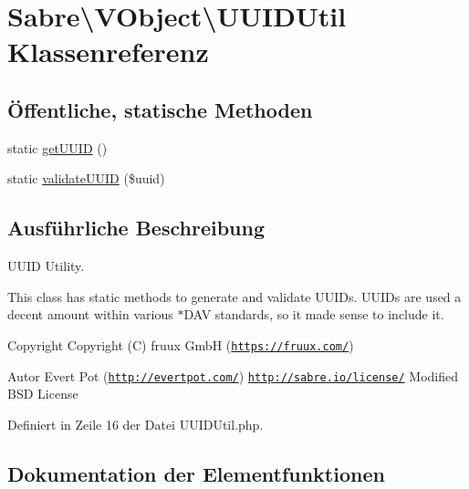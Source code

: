 \hypertarget{class_sabre_1_1_v_object_1_1_u_u_i_d_util}{}\section{Sabre\textbackslash{}V\+Object\textbackslash{}U\+U\+I\+D\+Util Klassenreferenz}
\label{class_sabre_1_1_v_object_1_1_u_u_i_d_util}
\subsection*{Öffentliche, statische Methoden}
\begin{DoxyCompactItemize}
\item 
static \mbox{\hyperlink{class_sabre_1_1_v_object_1_1_u_u_i_d_util_ac1ddb3af50bc514162f75bdfd03f8822}{get\+U\+U\+ID}} ()
\item 
static \mbox{\hyperlink{class_sabre_1_1_v_object_1_1_u_u_i_d_util_a8a97d40a9a52cad0b33fe4cc22507655}{validate\+U\+U\+ID}} (\$uuid)
\end{DoxyCompactItemize}


\subsection{Ausführliche Beschreibung}
U\+U\+ID Utility.

This class has static methods to generate and validate U\+U\+ID\textquotesingle{}s. U\+U\+I\+Ds are used a decent amount within various $\ast$\+D\+AV standards, so it made sense to include it.

\begin{DoxyCopyright}{Copyright}
Copyright (C) fruux GmbH (\href{https://fruux.com/}{\tt https\+://fruux.\+com/}) 
\end{DoxyCopyright}
\begin{DoxyAuthor}{Autor}
Evert Pot (\href{http://evertpot.com/}{\tt http\+://evertpot.\+com/})  \href{http://sabre.io/license/}{\tt http\+://sabre.\+io/license/} Modified B\+SD License 
\end{DoxyAuthor}


Definiert in Zeile 16 der Datei U\+U\+I\+D\+Util.\+php.



\subsection{Dokumentation der Elementfunktionen}
\mbox{\label{class_sabre_1_1_v_object_1_1_u_u_i_d_util_ac1ddb3af50bc514162f75bdfd03f8822}} 
